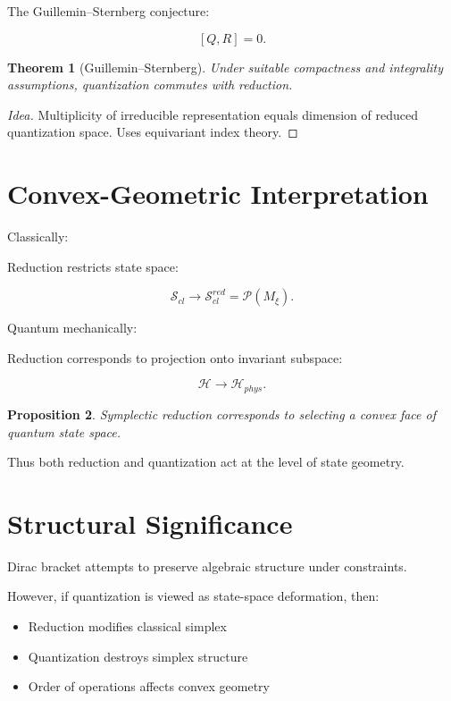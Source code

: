 \documentclass[11pt]{book}
\newtheorem{theorem}{Theorem}[chapter]
\newtheorem{proposition}[theorem]{Proposition}
\begin{document}
The Guillemin--Sternberg conjecture:

\[
[Q,R]=0.
\]

\begin{theorem}[Guillemin--Sternberg]
Under suitable compactness and integrality assumptions,
quantization commutes with reduction.
\end{theorem}

\begin{proof}[Idea]
Multiplicity of irreducible representation
equals dimension of reduced quantization space.
Uses equivariant index theory.
\end{proof}

\section{Convex-Geometric Interpretation}

Classically:

Reduction restricts state space:

\[
\mathcal{S}_{cl}
\to
\mathcal{S}_{cl}^{red}
=
\mathcal{P}(M_\xi).
\]

Quantum mechanically:

Reduction corresponds to projection onto invariant subspace:

\[
\mathcal{H}
\to
\mathcal{H}_{phys}.
\]

\begin{proposition}
Symplectic reduction corresponds to selecting
a convex face of quantum state space.
\end{proposition}

Thus both reduction and quantization
act at the level of state geometry.

\section{Structural Significance}

Dirac bracket attempts to preserve algebraic structure
under constraints.

However, if quantization is viewed as state-space deformation,
then:

\begin{itemize}
\item Reduction modifies classical simplex
\item Quantization destroys simplex structure
\item Order of operations affects convex geometry
\end{itemize}
\end{document}
